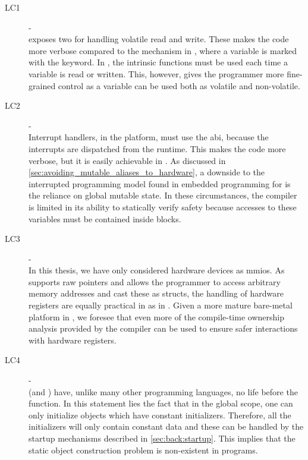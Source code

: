 \begin{description}
\item [LC1] - {\lci} \hfill \\
  {\rust} exposes two  for handling volatile read and write.
  These makes the code more verbose compared to the mechanism in {\C}, where a variable is marked with the  keyword.
  In {\rust}, the intrinsic functions must be used each time a variable is read or written.
  This, however, gives the programmer more fine-grained control as a variable can be used both as volatile and non-volatile.

\item [LC2] - {\lcii} \hfill \\
  Interrupt handlers, in the {\rg} platform, must use the {\C} \gls{abi}, because the interrupts are dispatched from the {\C} runtime.
  This makes the code more verbose, but it is easily achievable in {\rust}.
  As discussed in \autoref{sec:avoiding_mutable_aliases_to_hardware}, a downside to the interrupted programming model found in embedded programming for {\rust} is the reliance on global mutable state.
  In these circumstances, the compiler is limited in its ability to statically verify safety because accesses to these variables must be contained inside {\unsafe} blocks.

\item [LC3] - {\lciii} \hfill \\
  In this thesis, we have only considered hardware devices as \glspl{mmio}.
  As {\rust} supports raw pointers and allows the programmer to access arbitrary memory addresses and cast these as structs, the handling of hardware registers are equally practical in {\rust} as in {\C}.
  Given a more mature bare-metal platform in {\rust}, we foresee that even more of the compile-time ownership analysis provided by the {\rust} compiler can be used to ensure safer interactions with hardware registers.

\item [LC4] - {\lciv} \hfill \\
  {\rust} (and {\C}) have, unlike many other programming languages, no life before the {\main} function.
  In this statement lies the fact that in the global scope, one can only initialize objects which have constant initializers.
  Therefore, all the initializers will only contain constant data and these can be handled by the startup mechanisms described in \autoref{sec:back:startup}.
  This implies that the static object construction problem is non-existent in {\rust} programs.


\end{description}
